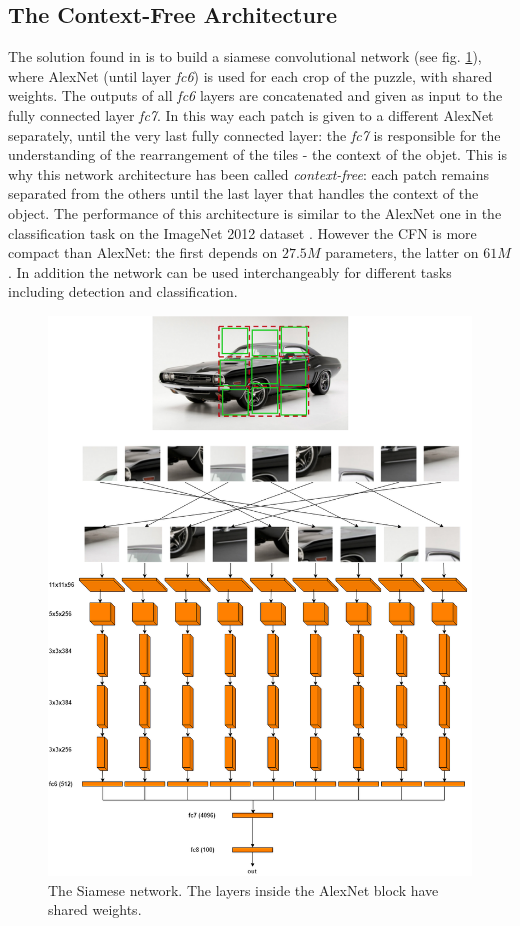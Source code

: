 \subsection{The Context-Free Architecture}\label{ss:CFN}
The solution found in \cite{Noroozi_2016} is to build a siamese convolutional network (see fig. \ref{fig:siamese_network}), where AlexNet (until layer \textit{fc6}) is used for each crop of the puzzle, with shared weights. The outputs of all \textit{fc6} layers are concatenated and given as input to the fully connected layer \textit{fc7}. In this way each patch is given to a different AlexNet separately, until the very last fully connected layer: the \textit{fc7} is responsible for the understanding of the rearrangement of the tiles - the context of the objet. This is why this network architecture has been called \textit{context-free}: each patch remains separated from the others until the last layer that handles the context of the object. \newline
The performance of this architecture is similar to the AlexNet one in the classification task on the ImageNet 2012 dataset \cite{Imagenet_large_scale_hierarchical_image_database}. However the CFN is more compact than AlexNet: the first depends on \(27.5M\) parameters, the latter on \(61M\). In addition the network can be used interchangeably for different tasks including detection and classification.
\begin{figure}[!ht]
    \centering
    \includegraphics[scale=0.26]{images/Siamese_diagram.png}
    \caption{The Siamese network. The layers inside the AlexNet block have shared weights.}
    \label{fig:siamese_network}
\end{figure}
